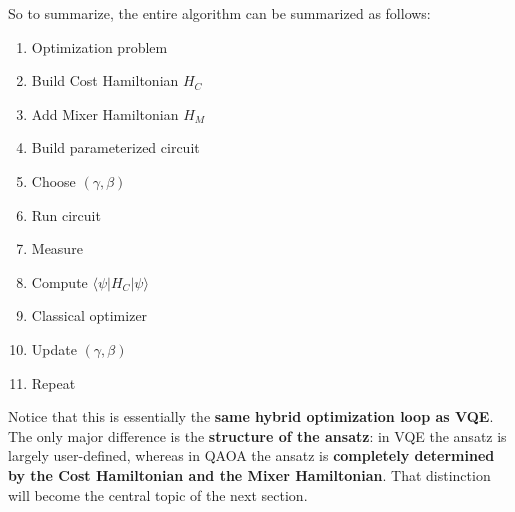 So to summarize, the entire algorithm can be summarized as follows:
\begin{enumerate}
    \item Optimization problem
    \item Build Cost Hamiltonian $H_C$
    \item Add Mixer Hamiltonian $H_M$
    \item Build parameterized circuit
    \item Choose $(\gamma, \beta)$
    \item Run circuit
    \item Measure
    \item Compute $\langle \psi | H_C | \psi \rangle$
    \item Classical optimizer
    \item Update $(\gamma, \beta)$
    \item Repeat
\end{enumerate}
Notice that this is essentially the \textbf{same hybrid optimization loop as VQE}. The only major difference is the \textbf{structure of the ansatz}: in VQE the ansatz is largely user-defined, whereas in QAOA the ansatz is \textbf{completely determined by the Cost Hamiltonian and the Mixer Hamiltonian}. That distinction will become the central topic of the next section.